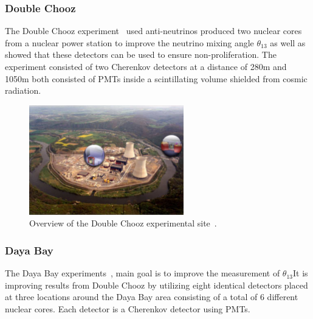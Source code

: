 \subsubsection{Double Chooz}
The Double Chooz experiment~\cite{45DoubleChooz} used anti-neutrinos produced two nuclear cores from a nuclear power station to improve the neutrino mixing angle $\theta_{13}$ as well as showed that these detectors can be used to ensure non-proliferation. The experiment consisted of two Cherenkov detectors at a distance of 280m and 1050m both consisted of PMTs inside a scintillating volume shielded from cosmic radiation. 

\begin{figure}[h!]
\centering
\includegraphics[width=0.6\textwidth]{figures/doubleChooz.jpeg}
\caption{Overview of the Double Chooz experimental site~\cite{45DoubleChooz}.}
\label{fig:dc}
\end{figure}

\subsubsection{Daya Bay}
The Daya Bay experiments~\cite{44DayaBay}, main goal is to improve the measurement of $\theta_{13}$It is improving results from Double Chooz by utilizing eight identical detectors placed at three locations around the Daya Bay area consisting of a total of 6 different nuclear cores. Each detector is a Cherenkov detector using PMTs.

